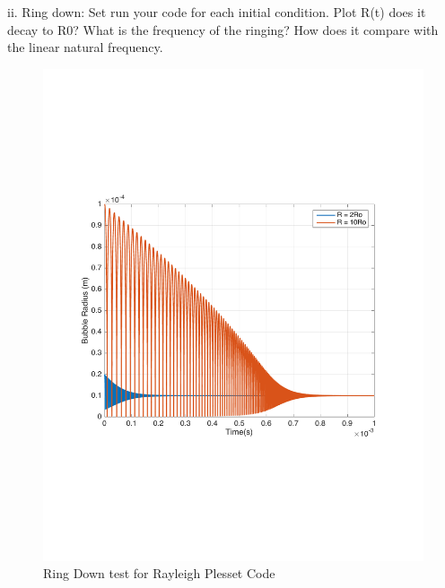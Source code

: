 \documentclass[12pt]{article}
\begin{document}
\begin{enumerate}
ii. Ring down:  Set run your code for each initial condition.  Plot R(t) does it decay to R0? What is the frequency of the ringing?  How does it compare with the linear natural frequency.
\begin{figure}[h]
\includegraphics[scale = 0.4]{ring_down}
\centering
\caption{Ring Down test for Rayleigh Plesset Code}
\end{figure}


\end{enumerate}
\end{document}
